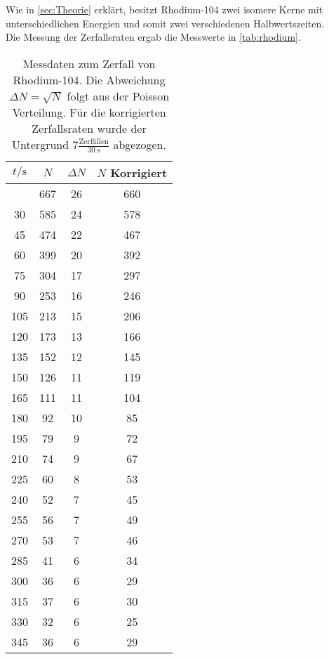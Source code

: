 Wie in \autoref{sec:Theorie} erklärt, besitzt Rhodium-104 zwei isomere Kerne mit unterschiedlichen 
Energien und somit zwei verschiedenen Halbwertszeiten.
\\
Die Messung der Zerfallsraten ergab die Messwerte in \autoref{tab:rhodium}.
\begin{longtable}{c c c c}
	\caption{Messdaten zum Zerfall von Rhodium-104. Die Abweichung $\Delta N = \sqrt{N}$ folgt
		aus der Poisson Verteilung. Für die korrigierten Zerfallsraten wurde der Untergrund 
	$7 \frac{\text{Zerfällen}}{\SI{30}{\second}}$ abgezogen.} \label{tab:rhodium} \\
		\hline
		$t / \si{\second}$ & $N$ & $\Delta N$ &$N$ Korrigiert \\
		\hline
		\endhead
		\hline
		\endfoot
		15  	& 667  	& 26         	& 660 \\
		 30  	& 585  	& 24         	& 578 \\
		 45  	& 474  	& 22         	& 467 \\
		 60  	& 399  	& 20         	& 392 \\
		 75  	& 304  	& 17         	& 297 \\
		 90  	& 253  	& 16         	& 246 \\
		105  	& 213  	& 15         	& 206 \\
		120  	& 173  	& 13         	& 166 \\
		135  	& 152  	& 12         	& 145 \\
		150  	& 126  	& 11         	& 119 \\
		165  	& 111  	& 11         	& 104 \\
		180  	&  92  	& 10         	&  85 \\
		195  	&  79  	&  9         	&  72 \\
		210  	&  74  	&  9         	&  67 \\
		225  	&  60  	&  8         	&  53 \\
		240  	&  52  	&  7         	&  45 \\
		255  	&  56  	&  7         	&  49 \\
		270  	&  53  	&  7         	&  46 \\
		285  	&  41  	&  6         	&  34 \\
		300  	&  36  	&  6         	&  29 \\
		315  	&  37  	&  6         	&  30 \\
		330  	&  32  	&  6         	&  25 \\
		345  	&  36  	&  6         	&  29 \\

\end{longtable}
